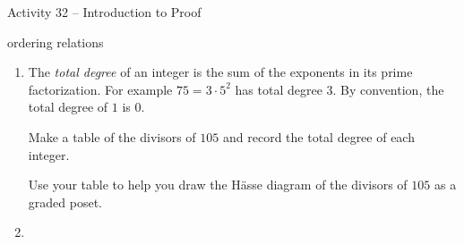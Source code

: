 \documentclass{amsart}
\begin{document}
\thispagestyle{empty}

\centerline{\Large Activity 32 -- Introduction to Proof}
\centerline{\large ordering relations}

\bigskip
\Large


\begin{enumerate}
	
\item The {\em total degree} of an integer is the sum of the exponents in its prime factorization.  For example $75 = 3 \cdot 5^2$ has total degree $3$.  By convention, the total degree of $1$ is $0$.

Make a table of the divisors of $105$ and record the total degree of each integer.

Use your table to help you draw the H\"{a}sse diagram of the divisors of $105$ as a graded poset.

\vfill

\item 

\end{enumerate}
\end{document}
